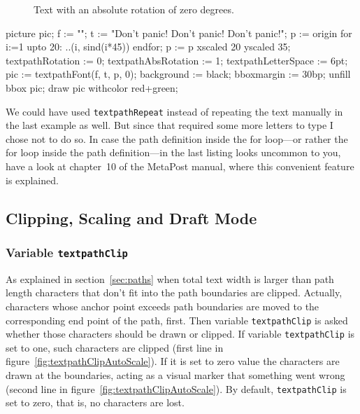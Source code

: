 \documentclass{article}
\newcommand*{\cmd}[1]{\texttt{#1}}
\newenvironment{listing}{%
  \small%
  \verbatim%
}{%
  \endverbatim%
}
\begin{document}
\begin{figure}
  \centering
  \caption{Text with an absolute rotation of zero degrees.}
  \label{fig:textpathAbsRotation}
\end{figure}

\begin{listing}
picture pic;
f := "\Large";%
t := "Don't panic!  Don't panic!  Don't panic!";
p := origin
for i:=1 upto 20: ..(i, sind(i*45)) endfor;
p := p xscaled 20 yscaled 35;
textpathRotation := 0;
textpathAbsRotation := 1;
textpathLetterSpace := 6pt;
pic := textpathFont(f, t, p, 0);
background := black;
bboxmargin := 30bp;
unfill bbox pic;
draw pic withcolor red+green;
\end{listing}

We could have used \cmd{textpathRepeat} instead of repeating the text manually in the last example as well.  But since that required some more letters to type I chose not to do so.  In case the path definition inside the for loop---or rather the for loop inside the path definition---in the last listing looks uncommon to you, have a look at chapter~10 of the MetaPost manual, where this convenient feature is explained.


\subsection{Clipping, Scaling and Draft Mode}\label{sec:ClippingScalingDraft}

\subsubsection{Variable \cmd{textpathClip}}
As explained in section~\ref{sec:paths} when total text width is larger than path length characters that don't fit into the path boundaries are clipped.  Actually, characters whose anchor point exceeds path boundaries are moved to the corresponding end point of the path, first.  Then variable \cmd{textpathClip} is asked whether those characters should be drawn or clipped.  If variable \cmd{textpathClip} is set to one, such characters are clipped (first line in figure~\ref{fig:textpathClipAutoScale}).  If it is set to zero value the characters are drawn at the boundaries, acting as a visual marker that something went wrong (second line in figure~\ref{fig:textpathClipAutoScale}).  By default, \cmd{textpathClip} is set to zero, that is, no characters are lost.
\end{document}
